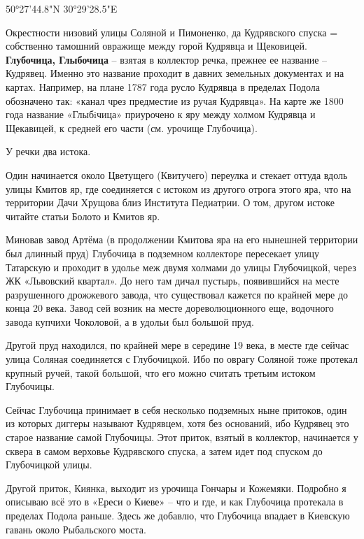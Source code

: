 50°27'44.8"N 30°29'28.5"E

Окрестности низовий улицы Соляной и Пимоненко, да Кудрявского спуска = собственно тамошний овражище между горой Кудрявца и Щековицей.\\

\textbf{Глубочица, Глыбочица} – взятая в коллектор речка, прежнее ее название – Кудрявец. Именно это название проходит в давних земельных документах и на картах. Например, на плане 1787 года русло Кудрявца в пределах Подола обозначено так: «канал чрез предместие из ручая Кудрявца». На карте же 1800 года название «Глыбiчица» приурочено к яру между холмом Кудрявца и Щекавицей, к средней его части (см. урочище Глубочица).

У речки два истока. 

Один начинается около Цветущего (Квитучего) переулка и стекает оттуда вдоль улицы Кмитов яр, где соединяется с истоком из другого отрога этого яра, что на территории Дачи Хрущова близ Института Педиатрии. О том, другом истоке читайте статьи Болото и Кмитов яр.

Миновав завод Артёма (в продолжении Кмитова яра на его нынешней территории был длинный пруд) Глубочица в подземном коллекторе пересекает улицу Татарскую и проходит в удолье меж двумя холмами до улицы Глубочицкой, через ЖК «Львовский квартал». До него там дичал пустырь, появившийся на месте разрушенного дрожжевого завода, что существовал кажется по крайней мере до конца 20 века. Завод сей возник на месте дореволюционного еще, водочного завода купчихи Чоколовой, а в удольи был большой пруд.

Другой пруд находился, по крайней мере в середине 19 века, в месте где сейчас улица Соляная соединяется с Глубочицкой. Ибо по оврагу Соляной тоже протекал крупный ручей, такой большой, что его можно считать третьим истоком Глубочицы.

Сейчас Глубочица принимает в себя несколько подземных ныне притоков, один из которых диггеры называют Кудрявцем, хотя без оснований, ибо Кудрявец это старое название самой Глубочицы. Этот приток, взятый в коллектор, начинается у сквера в самом верховье Кудрявского спуска, а затем идет под спуском до Глубочицкой улицы.

Другой приток, Киянка, выходит из урочища Гончары и Кожемяки. Подробно я описываю всё это в «Ереси о Киеве» – что и где, и как Глубочица протекала в пределах Подола раньше. Здесь же добавлю, что Глубочица впадает в Киевскую гавань около Рыбальского моста.\\

